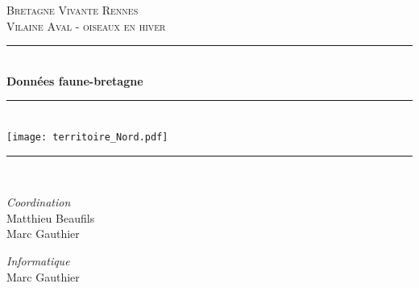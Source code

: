 \documentclass[a4paper,twoside,english]{article}
\newcommand{\HRule}{\rule{\linewidth}{0.5mm}}
\begin{document}
%
\begin{titlepage}
  \begin{sffamily}
  \begin{center}



    \textsc{\LARGE Bretagne Vivante Rennes}\\[1cm]
    \textsc{\Large Vilaine Aval - oiseaux en hiver}\\[1cm]

    \HRule \\[0.4cm]
    { \huge \bfseries Données faune-bretagne}
    \HRule \\[0.4cm]
    \texttt{[image: territoire\_Nord.pdf]}~\\[.5cm]
    \HRule \\[0.4cm]
    \begin{minipage}{0.4\textwidth}
      \begin{flushleft} \large
        \emph{Coordination}\\
        Matthieu Beaufils\\
         Marc Gauthier
      \end{flushleft}
    \end{minipage}
    \begin{minipage}{0.4\textwidth}
      \begin{flushright} \large
        \emph{Informatique}\\
        Marc Gauthier
      \end{flushright}
    \end{minipage}

    \vfill
  \end{center}
  \end{sffamily}
\end{titlepage}
\setlength{\parskip}{0pt} %
\setlength{\parindent}{0pt}
\twocolumn

\onecolumn
\end{document}

